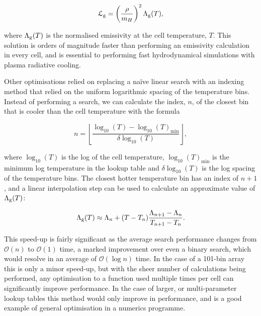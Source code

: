 \begin{equation}
  \mathcal{L}_\text{g} = \left(\frac{\rho}{m_H}\right)^2 \Lambda_\text{g} (T) ,
\end{equation}

\noindent
where $\Lambda_\text{g}(T)$ is the normalised emissivity at the cell temperature, $T$.
This solution is orders of magnitude faster than performing an emissivity calculation in every cell, and is essential to performing fast hydrodynamical simulations with plasma radiative cooling.

Other optimisations relied on replacing a na\"ive linear search with an indexing method that relied on the uniform logarithmic spacing of the temperature bins.
Instead of performing a search, we can calculate the index, $n$, of the closest bin that is cooler than the cell temperature with the formula

\begin{equation}
    \label{eq:logspaceemissivity}
    n = \left \lfloor \frac{\log_{10}(T) - \log_{10}(T)_\text{min}}{\delta \log_{10} (T)} \right \rfloor ,
\end{equation}

\noindent
where $\log_{10}(T)$ is the log of the cell temperature, $\log_{10} (T)_\text{min}$ is the minimum log temperature in the lookup table and $\delta \log_{10} (T)$ is the log spacing of the temperature bins.
The closest hotter temperature bin has an index of $n+1$, and a linear interpolation step can be used to calculate an approximate value of $\Lambda_\text{g}(T)$:

\begin{equation}
  \label{eq:logspaceinterpolate}
  \Lambda_\text{g}(T) \approx \Lambda_n + (T - T_n) \frac{\Lambda_{n+1} - \Lambda_n}{T_{n+1} - T_n} .
\end{equation}

\noindent
This speed-up is fairly significant as the average search performance changes from $\mathcal{O}(n)$ to $\mathcal{O}(1)$ time, a marked improvement over even a binary search, which would resolve in an average of $\mathcal{O}(\log n)$ time.
In the case of a 101-bin array this is only a minor speed-up, but with the sheer number of calculations being performed, any optimisation to a function used multiple times per cell can significantly improve performance.
In the case of larger, or multi-parameter lookup tables this method would only improve in performance, and is a good example of general optimisation in a numerics programme.


